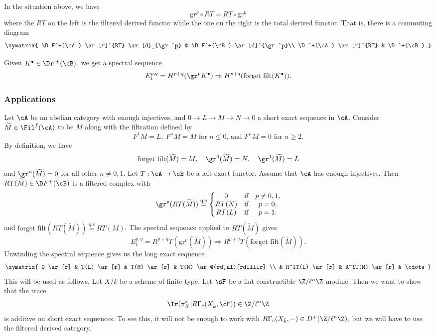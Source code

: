 \begin{prop}
In the situation above, we have
$$
\mathrm{gr}^p \circ RT = RT \circ \mathrm{gr}^p
$$
where the $RT$ on the left is the filtered derived functor while the one on the right is the total derived functor. That is, there is a commuting diagram
$$
\xymatrix{
\D F^+(\cA) \ar[r]^{RT} \ar[d]_{\gr^p} & \D F^+(\cB) \ar[d]^{\gr^p}\\
\D^+(\cA) \ar[r]^{RT} & \D^+(\cB).}
$$
\end{prop}

Given $K^\bullet \in \D F^+(\cB)$, we get a spectral sequence 
$$
E_1^{p,q} = H^{p+q}(\gr^p K^\bullet) \Rightarrow H^{p+q}(\text{forget filt}(K^\bullet)).
$$

\subsubsection{Applications}

Let $\cA$ be an abelian category with enough injectives, and $0 \to L \to M \to N \to 0$ a short exact sequence in $\cA$. Consider $\widetilde M \in \Fil^f(\cA)$ to be $M$ along with the filtration defined by 
$$
F^1M = L, \ F^nM = M
\text{ for $n \leqslant 0$, and $F^nM = 0$ for $n \geqslant 2$.} 
$$
By definition, we have
$$
\text{forget filt}(\widetilde M) = M, \quad
\gr^0(\widetilde M) = N, \quad
\gr^1(\widetilde M) = L 
$$
and $\gr^n(\widetilde M) = 0$ for all other $n \neq 0,1$. Let $T: \cA \to \cB$ be a left exact functor. Assume that $\cA$ has enough injectives.  Then $RT(\widetilde M) \in \D F^+(\cB)$ is a filtered complex with 
$$
\gr^p(RT(\widetilde M)) \stackrel {\mathrm{qis}}{=} \left \{
\begin{matrix}
0 & \text{if} & p \neq 0,1, \\
RT(N) & \text{if} & p = 0, \\
RT(L) & \text{if} & p = 1.
\end{matrix}
\right . 
$$
and $\text{forget filt}(RT(\widetilde M))\stackrel{\text{qis}}{ = } RT(M)$. The spectral sequence applied to $RT(\widetilde M)$ gives
$$
E_1^{p,q} = R^{p+q}T(\mathrm{gr}^p(\widetilde M)) \Rightarrow R^{p+q}T(\text{forget filt}(\widetilde M)).
$$
Unwinding the spectral sequence gives us the long exact sequence
$$
\xymatrix{
  0 \ar[r] & T(L) \ar[r] & T(M) \ar[r] & T(N) \ar@(rd,ul)[rdllllr] \\
& R^1T(L) \ar[r] & R^1T(M) \ar[r] & \cdots
}
$$
This will be used as follows. Let $X/k$ be a scheme of finite type.  Let $\sF$ be a flat constructible $\Z/\ell^n \Z$-module.  Then we want to show that the trace 
$$
\Tr( \pi_X^\ast | R\Gamma_c(X_{\bar k}, \cF)) \in \Z/\ell^n \Z
$$
is additive on short exact sequences. To see this, it will not be enough to work with $R\Gamma_c(X_{\bar k}, -) \in D^+(\Z/\ell^n \Z)$, but we will have to use the filtered derived category.

